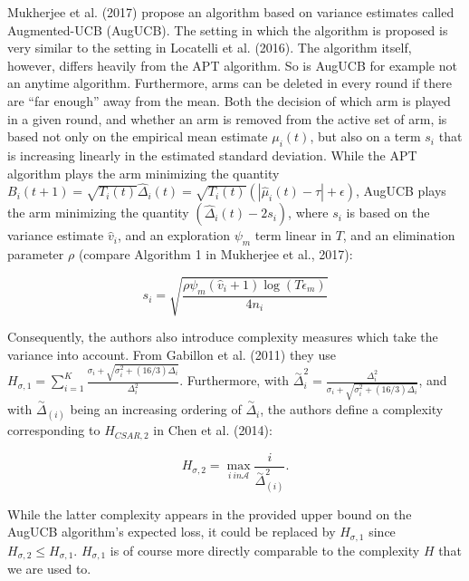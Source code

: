 \documentclass[12pt,]{article}
\begin{document}
Mukherjee et al. (2017) propose an algorithm based on variance estimates
called Augmented-UCB (AugUCB). The setting in which the algorithm is
proposed is very similar to the setting in Locatelli et al. (2016). The
algorithm itself, however, differs heavily from the APT algorithm. So is
AugUCB for example not an anytime algorithm. Furthermore, arms can be
deleted in every round if there are ``far enough'' away from the mean.
Both the decision of which arm is played in a given round, and whether
an arm is removed from the active set of arm, is based not only on the
empirical mean estimate \(\mu_i(t)\), but also on a term \(s_i\) that is
increasing linearly in the estimated standard deviation. While the APT
algorithm plays the arm minimizing the quantity
\(B_i(t+1) = \sqrt{T_i(t)} \hat{\Delta}_i(t) = \sqrt{T_i(t)} (|\hat{\mu}_i(t) - \tau| + \epsilon)\),
AugUCB plays the arm minimizing the quantity
\((\hat{\Delta}_i(t) - 2s_i)\), where \(s_i\) is based on the variance
estimate \(\hat{v}_i\), and an exploration \(\psi_m\) term linear in
\(T\), and an elimination parameter \(\rho\) (compare Algorithm 1 in
Mukherjee et al., 2017):

\begin{equation*}
s_i = \sqrt{\frac{\rho \psi_m (\hat{v}_i + 1) \log(T \epsilon_m)}{4n_i}}
\end{equation*}

Consequently, the authors also introduce complexity measures which take
the variance into account. From Gabillon et al. (2011) they use
\(H_{\sigma, 1}= \sum_{i=1}^K \frac{\sigma_i + \sqrt{\sigma_i^2 + (16/3)\Delta_i}}{\Delta_i^2}\).
Furthermore, with
\(\stackrel{\sim}{\Delta}_i^2 = \frac{\Delta_i^2}{\sigma_i + \sqrt{\sigma_i^2 + (16/3)\Delta_i}}\),
and with \(\stackrel{\sim}{\Delta}_{(i)}\) being an increasing ordering
of \(\stackrel{\sim}{\Delta}_i\), the authors define a complexity
corresponding to \(H_{CSAR,2}\) in Chen et al. (2014):

\begin{equation*}
H_{\sigma,2} = \max_{i \ in \mathcal{A}} \frac{i}{\stackrel{\sim}{\Delta}_{(i)}^2}.
\end{equation*}

While the latter complexity appears in the provided upper bound on the
AugUCB algorithm's expected loss, it could be replaced by
\(H_{\sigma, 1}\) since \(H_{\sigma, 2} \leq H_{\sigma,1}\).
\(H_{\sigma,1}\) is of course more directly comparable to the complexity
\(H\) that we are used to.
\end{document}
